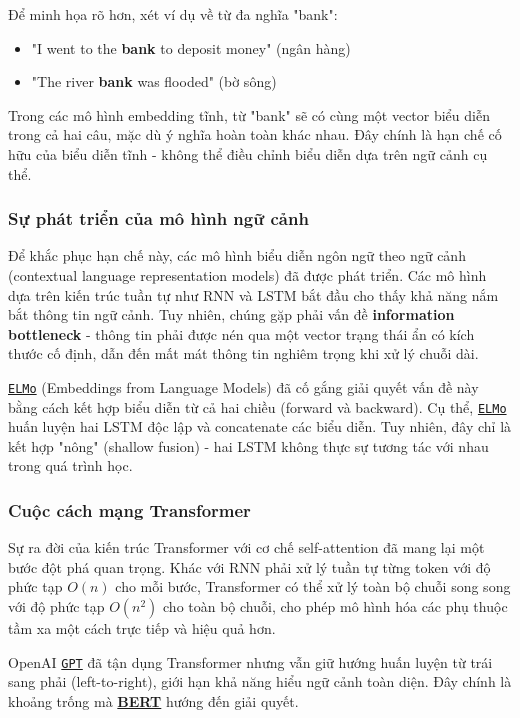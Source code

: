 Để minh họa rõ hơn, xét ví dụ về từ đa nghĩa "bank":
\begin{itemize}
    \item "I went to the \textbf{bank} to deposit money" (ngân hàng)
    \item "The river \textbf{bank} was flooded" (bờ sông)
\end{itemize}

Trong các mô hình embedding tĩnh, từ "bank" sẽ có cùng một vector biểu diễn trong cả hai câu, mặc dù ý nghĩa hoàn toàn khác nhau. Đây chính là hạn chế cố hữu của biểu diễn tĩnh - không thể điều chỉnh biểu diễn dựa trên ngữ cảnh cụ thể.

\subsubsection{Sự phát triển của mô hình ngữ cảnh}
Để khắc phục hạn chế này, các mô hình biểu diễn ngôn ngữ theo ngữ cảnh (contextual language representation models) đã được phát triển. Các mô hình dựa trên kiến trúc tuần tự như RNN và LSTM bắt đầu cho thấy khả năng nắm bắt thông tin ngữ cảnh. Tuy nhiên, chúng gặp phải vấn đề \textbf{information bottleneck} - thông tin phải được nén qua một vector trạng thái ẩn có kích thước cố định, dẫn đến mất mát thông tin nghiêm trọng khi xử lý chuỗi dài.

\hyperref[acro:elmo]{\texttt{ELMo}} (Embeddings from Language Models) \cite{peters2018deep} đã cố gắng giải quyết vấn đề này bằng cách kết hợp biểu diễn từ cả hai chiều (forward và backward). Cụ thể, \hyperref[acro:elmo]{\texttt{ELMo}} huấn luyện hai LSTM độc lập và concatenate các biểu diễn. Tuy nhiên, đây chỉ là kết hợp "nông" (shallow fusion) - hai LSTM không thực sự tương tác với nhau trong quá trình học.

\subsubsection{Cuộc cách mạng Transformer}
Sự ra đời của kiến trúc Transformer \cite{vaswani2017attention} với cơ chế self-attention đã mang lại một bước đột phá quan trọng. Khác với RNN phải xử lý tuần tự từng token với độ phức tạp $O(n)$ cho mỗi bước, Transformer có thể xử lý toàn bộ chuỗi song song với độ phức tạp $O(n^2)$ cho toàn bộ chuỗi, cho phép mô hình hóa các phụ thuộc tầm xa một cách trực tiếp và hiệu quả hơn.

OpenAI \hyperref[acro:gpt]{\texttt{GPT}} \cite{radford2018improving} đã tận dụng Transformer nhưng vẫn giữ hướng huấn luyện từ trái sang phải (left-to-right), giới hạn khả năng hiểu ngữ cảnh toàn diện. Đây chính là khoảng trống mà \hyperref[acro:bert]{\textbf{BERT}} hướng đến giải quyết.

